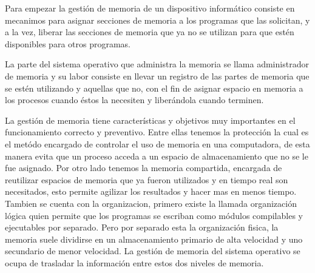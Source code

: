 \documentclass{article}
\begin{document}
Para empezar la gestión de memoria de un dispositivo informático consiste en mecanimos para asignar secciones de memoria a los programas que las solicitan, y a la vez, liberar las secciones de memoria que ya no se utilizan para que estén disponibles para otros programas. 

La parte del sistema operativo que administra la memoria se llama administrador de memoria y su labor consiste en llevar un registro de las partes de memoria que se estén utilizando y aquellas que no, con el fin de asignar espacio en memoria a los procesos cuando éstos la necesiten y liberándola cuando terminen.

La gestión de memoria tiene características y objetivos muy importantes en el funcionamiento correcto y preventivo. Entre ellas tenemos la protección la cual es el metódo encargado de controlar el uso de memoria en una computadora, de esta manera evita que un proceso acceda a un espacio de almacenamiento que no se le fue asignado. 
Por otro lado tenemos la memoria compartida, encargada de reutilizar espacios de memoria que ya fueron utilizados y en tiempo real son necesitados, esto permite agilizar los resultados y hacer mas en menos tiempo.
Tambien se cuenta con la organizacion, primero existe la llamada organización lógica quien permite que los programas se escriban como módulos compilables y ejecutables por separado. Pero por separado esta la organización fisica, la memoria suele dividirse en un almacenamiento primario de alta velocidad y uno secundario de menor velocidad.  La gestión de memoria del sistema operativo se ocupa de trasladar la información entre estos dos niveles de memoria.
\end{document}
